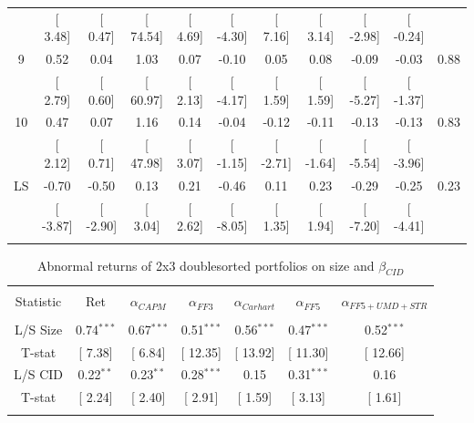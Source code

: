\documentclass[12pt]{article}
\begin{document}
\begin{table}[!htbp]
\begin{tabular}{@{\extracolsep{0pt}} ccccccccccc}
 & [ 3.48] & [ 0.47] & [ 74.54] & [ 4.69] & [ -4.30] & [ 7.16] & [ 3.14] & [ -2.98] & [ -0.24] &  \\ 
9 & 0.52 & 0.04 & 1.03 & 0.07 & -0.10 & 0.05 & 0.08 & -0.09 & -0.03 & 0.88 \\ 
 & [ 2.79] & [ 0.60] & [ 60.97] & [ 2.13] & [ -4.17] & [ 1.59] & [ 1.59] & [ -5.27] & [ -1.37] &  \\ 
10 & 0.47 & 0.07 & 1.16 & 0.14 & -0.04 & -0.12 & -0.11 & -0.13 & -0.13 & 0.83 \\ 
 & [ 2.12] & [ 0.71] & [ 47.98] & [ 3.07] & [ -1.15] & [ -2.71] & [ -1.64] & [ -5.54] & [ -3.96] &  \\ 
LS & -0.70 & -0.50 & 0.13 & 0.21 & -0.46 & 0.11 & 0.23 & -0.29 & -0.25 & 0.23 \\ 
 & [ -3.87] & [ -2.90] & [ 3.04] & [ 2.62] & [ -8.05] & [ 1.35] & [ 1.94] & [ -7.20] & [ -4.41] &  \\ 
\hline \\[-1.8ex] 
\end{tabular} 
\end{table} 



\begin{table}[!htbp] \centering 
  \caption{Abnormal returns of 2x3 doublesorted portfolios on size and $\beta_{CID}$} 
  \label{} 
\begin{tabular}{@{\extracolsep{5pt}} ccccccc} 
\\[-1.8ex]\hline 
\hline \\[-1.8ex] 
Statistic & Ret & $\alpha_{CAPM}$ & $\alpha_{FF3}$ & $\alpha_{Carhart}$ & $\alpha_{FF5}$ & $\alpha_{FF5+UMD+STR}$ \\ 
\hline \\[-1.8ex] 
L/S Size & 0.74$^{***}$ & 0.67$^{***}$ & 0.51$^{***}$ & 0.56$^{***}$ & 0.47$^{***}$ & 0.52$^{***}$ \\ 
T-stat & [ 7.38] & [ 6.84] & [ 12.35] & [ 13.92] & [ 11.30] & [ 12.66] \\ 
L/S CID & 0.22$^{**}$ & 0.23$^{**}$ & 0.28$^{***}$ & 0.15 & 0.31$^{***}$ & 0.16 \\ 
T-stat & [ 2.24] & [ 2.40] & [ 2.91] & [ 1.59] & [ 3.13] & [ 1.61] \\ 
\hline \\[-1.8ex] 
\end{tabular} 
\end{table}
\end{document}
